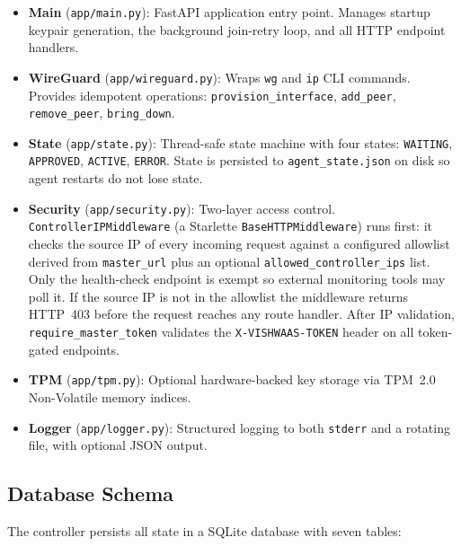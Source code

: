 \documentclass[conference]{IEEEtran}
\begin{document}
\begin{itemize}
  \item \textbf{Main} (\texttt{app/main.py}): FastAPI application entry point.
        Manages startup keypair generation, the background join-retry loop, and
        all HTTP endpoint handlers.
  \item \textbf{WireGuard} (\texttt{app/wireguard.py}): Wraps \texttt{wg} and
        \texttt{ip} CLI commands. Provides idempotent operations:
        \texttt{provision\_interface}, \texttt{add\_peer}, \texttt{remove\_peer},
        \texttt{bring\_down}.
  \item \textbf{State} (\texttt{app/state.py}): Thread-safe state machine with
        four states: \texttt{WAITING}, \texttt{APPROVED}, \texttt{ACTIVE},
        \texttt{ERROR}. State is persisted to \texttt{agent\_state.json} on disk
        so agent restarts do not lose state.
  \item \textbf{Security} (\texttt{app/security.py}): Two-layer access control.
        \texttt{ControllerIPMiddleware} (a Starlette \texttt{BaseHTTPMiddleware})
        runs first: it checks the source IP of every incoming request against a
        configured allowlist derived from \texttt{master\_url} plus an optional
        \texttt{allowed\_controller\_ips} list. Only the health-check endpoint is
        exempt so external monitoring tools may poll it. If the source IP is not
        in the allowlist the middleware returns HTTP~403 before the request
        reaches any route handler. After IP validation, \texttt{require\_master\_token}
        validates the \texttt{X-VISHWAAS-TOKEN} header on all token-gated endpoints.
  \item \textbf{TPM} (\texttt{app/tpm.py}): Optional hardware-backed key storage
        via TPM~2.0 Non-Volatile memory indices.
  \item \textbf{Logger} (\texttt{app/logger.py}): Structured logging to both
        \texttt{stderr} and a rotating file, with optional JSON output.
\end{itemize}

\subsection{Database Schema}

The controller persists all state in a SQLite database with seven tables:
\end{document}
